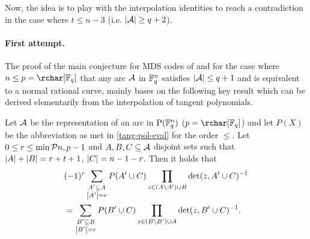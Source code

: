 Now, the idea is to play with the interpolation identities to reach a
contradiction in the case where $t\leq n-3$ (i.e. $\left|\mathcal{A}\right|\geq q+2$).

\paragraph{First attempt.} The proof of the main conjecture for MDS codes of  and  for the case where
$n\leq p=\rchar[\field{q}]$ that any arc $\mathcal{A}$ in $\mathbb{F}_{q}^n$ satisfies $\left|\mathcal{A}\right|\leq q+1$ and is equivalent to a normal rational
curve, mainly bases on the following key result which can be derived elementarily from the interpolation of tangent polynomials.

\begin{lemma}\label{mds-abc-lemma}
    Let $\mathcal{A}$ be the representation of an arc in $\P(\field{q}^n)$ ($p=\rchar[\field{q}]$) and let
    $P(X)$ be the abbreviation as met in \autoref{tang-pol-eval} for the order $\leq$. Let $0\leq
    r\leq\min\set{n,p}-1$ and $A,B,C\subseteq \mathcal{A}$ disjoint sets such
    that $\left|A\right|+\left|B\right|=r+t+1$, $\left|C\right|=n-1-r$. Then it holds that
    \begin{align*}
        &(-1)^r\sum_{\substack{A'\subseteq A\\ \left|A'\right|=r}}{P(A'\cup C)\prod_{z\in (A\setminus A')\cup B}{\det(z,A'\cup C)^{-1}}}\\
        &= \sum_{\substack{B'\subseteq B\\ \left|B'\right|=r}}{P(B'\cup C)\prod_{z\in (B\setminus B')\cup A}{\det(z,B'\cup C)^{-1}}}\text{.}
    \end{align*}
\end{lemma}

